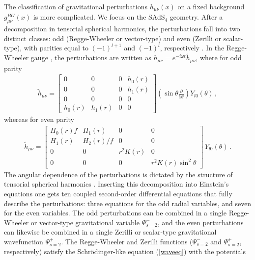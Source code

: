 \documentclass[]{iopart}
\begin{document}
The classification of gravitational perturbations $h_{\mu\nu}(x)$ on a fixed
background $g_{\mu\nu}^{BG}(x)$ is more complicated.  We focus on the SAdS$_4$
geometry.  After a decomposition in tensorial spherical harmonics, the
perturbations fall into two distinct classes: odd (Regge-Wheeler or
vector-type) and even (Zerilli or scalar-type), with parities equal to
$(-1)^{l+1}$ and $(-1)^l$, respectively
\cite{Nagar:2005ea,Thorne:1980ru,Zerilli:1971wd,mathewsharmonics}.
%
In the Regge-Wheeler gauge
\cite{Kokkotas:1999bd,Nollert:1999ji,Nagar:2005ea,Regge:1957rw,Vishveshwara:1970cc},
the perturbations are written as $h_{\mu \nu}= e^{-i\omega t} \tilde{h}_{\mu
  \nu}$, where for odd parity
%
%
\begin{eqnarray}
\tilde{h}_{\mu \nu}= \left[
 \begin{array}{cccc}
 0 & 0 &0 & h_0(r)
\\ 0 & 0 &0 & h_1(r)
\\ 0 & 0 &0 & 0
\\ h_0(r) & h_1(r) &0 &0
\end{array}\right]
\left(\sin\theta\frac{\partial}{\partial\theta}\right)
Y_{l0}(\theta)\,, \label{oddgauge}
\end{eqnarray}
%
whereas for even parity
%
\begin{eqnarray}
\tilde{h}_{\mu \nu}= \left[
 \begin{array}{cccc}
 H_0(r) f & H_1(r) &0 & 0
\\ H_1(r) & H_2(r)/f  &0 & 0
\\ 0 & 0 &r^2K(r) & 0
\\ 0 & 0 &0 & r^2K(r)\sin^2\theta
\end{array}\right] \, Y_{l0}(\theta)\,. \label{evengauge}
\end{eqnarray}
%
The angular dependence of the perturbations is dictated by the structure of
tensorial spherical harmonics
\cite{Nagar:2005ea,Thorne:1980ru,Zerilli:1971wd,mathewsharmonics}.  Inserting
this decomposition into Einstein's equations one gets ten coupled second-order
differential equations that fully describe the perturbations: three equations
for the odd radial variables, and seven for the even variables. The odd
perturbations can be combined in a single Regge-Wheeler or vector-type
gravitational variable $\Psi^-_{s=2}$, and the even perturbations can likewise
be combined in a single Zerilli or scalar-type gravitational wavefunction
$\Psi^+_{s=2}$. The Regge-Wheeler and Zerilli functions ($\Psi^-_{s=2}$ and
$\Psi^+_{s=2}$, respectively) satisfy the Schr\"odinger-like equation
(\ref{waveeq}) with the potentials
\end{document}
